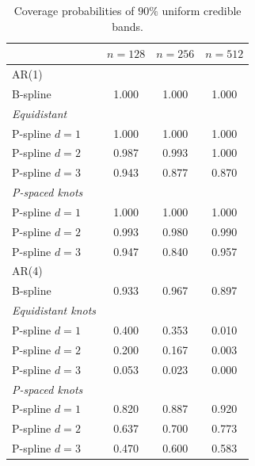 \documentclass[twocolumn,final]{svjour3}
\begin{document}
\begin{table}
	\centering
		\begin{tabular}{lccc}
			\toprule
			& $n=128$ & $n=256$ & $n=512$ \\ \hline
			AR(1)     &  &  &  \\ 
			B-spline &  1.000 & 1.000 & 1.000 \\
			\textit{Equidistant}& & &   \\
			\hspace{0.5em}P-spline $d=1$& 1.000 & 1.000 & 1.000  \\
			\hspace{0.5em}P-spline $d=2$& 0.987 & 0.993 & 1.000  \\
			\hspace{0.5em}P-spline $d=3$& 0.943 & 0.877 & 0.870  \\
			\textit{P-spaced knots}& & &   \\
			\hspace{0.5em}P-spline $d=1$ & 1.000 & 1.000 & 1.000 \\
			\hspace{0.5em}P-spline $d=2$ & 0.993 & 0.980 & 0.990 \\
			\hspace{0.5em}P-spline $d=3$ & 0.947 & 0.840 & 0.957 \\ \hline		       
			AR(4)     &  &  &  \\ 
			B-spline &  0.933 & 0.967 & 0.897  \\
			\textit{Equidistant knots}& & &   \\
			\hspace{0.5em}P-spline $d=1$ & 0.400 & 0.353 & 0.010 \\
			\hspace{0.5em}P-spline $d=2$ & 0.200 & 0.167 & 0.003 \\
			\hspace{0.5em}P-spline $d=3$ & 0.053 & 0.023 & 0.000 \\
			\textit{P-spaced knots}& & &   \\	
			\hspace{0.5em}P-spline $d=1$ & 0.820 & 0.887 & 0.920 \\
			\hspace{0.5em}P-spline $d=2$ & 0.637 & 0.700 & 0.773 \\
			\hspace{0.5em}P-spline $d=3$ & 0.470 & 0.600 & 0.583 \\	
			\bottomrule
		\end{tabular}
	\caption{Coverage probabilities of $90\%$ uniform credible bands.}
	\label{table:sim_covPbb}
\end{table}
\end{document}
